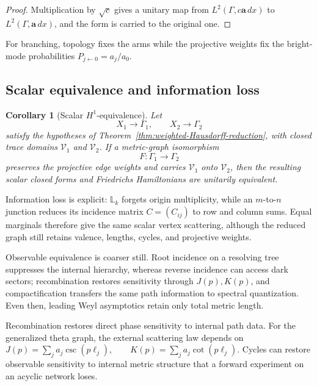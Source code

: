 \documentclass[11pt]{article}
\theoremstyle{plain}
\newtheorem{corollary}[theorem]{Corollary}
\theoremstyle{definition}
\begin{document}
\begin{proof}
Multiplication by \(\sqrt c\) gives a unitary map from
\(L^2(\Gamma,c\mathbf a\,dx)\) to
\(L^2(\Gamma,\mathbf a\,dx)\), and the form is carried to the original one.
\end{proof}

For branching, topology fixes the arms while the projective weights fix the bright-mode probabilities \(P_{j\leftarrow0}=a_j/a_0\).

\subsection{Scalar equivalence and information loss}
\label{subsec:scalar-equivalent-resolutions}
\label{subsec:what-survives-scalar}

\begin{corollary}[Scalar \(H^1\)-equivalence]
\label{cor:scalar-H1-equivalence}
Let
\[
  X_1\longrightarrow\Gamma_1,
  \qquad
  X_2\longrightarrow\Gamma_2
\]
satisfy the hypotheses of
Theorem~\ref{thm:weighted-Hausdorff-reduction}, with closed trace domains
\(\mathcal V_1\) and \(\mathcal V_2\). If a metric-graph isomorphism
\[
  F:\Gamma_1\longrightarrow\Gamma_2
\]
preserves the projective edge weights and carries \(\mathcal V_1\) onto
\(\mathcal V_2\), then the resulting scalar closed forms and Friedrichs
Hamiltonians are unitarily equivalent.
\end{corollary}

Information loss is explicit: \(\mathbb L_k\) forgets origin multiplicity, while an \(m\)-to-\(n\) junction reduces its incidence matrix \(C=(C_{ij})\) to row and column sums. Equal marginals therefore give the same scalar vertex scattering, although the reduced graph still retains valence, lengths, cycles, and projective weights.



Observable equivalence is coarser still. Root incidence on a resolving tree suppresses the internal hierarchy, whereas reverse incidence can access dark sectors; recombination restores sensitivity through \(J(p),K(p)\), and compactification transfers the same path information to spectral quantization. Even then, leading Weyl asymptotics retain only total metric length.

Recombination restores direct phase sensitivity to internal path data. For the generalized theta graph, the external scattering law
depends on
\(J(p)=\sum_j a_j\csc(p\ell_j), \qquad K(p)=\sum_j a_j\cot(p\ell_j)\).
Cycles can restore observable sensitivity to internal metric structure
that a forward experiment on an acyclic network loses.
\end{document}
